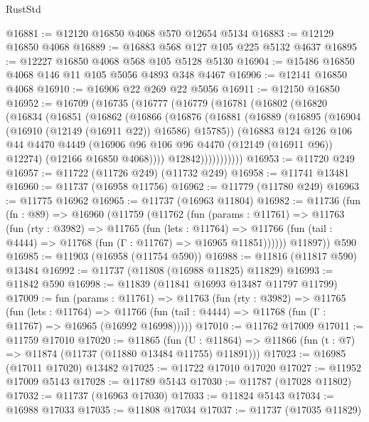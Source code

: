 \begin{lexlean}{RustStd}
\begin{coremodule}
@16881 := @12120 @16850 @4068 @570 @12654 @5134
@16883 := @12129 @16850 @4068
@16889 := @16883 @568 @127 @105 @225 @5132 @4637
@16895 := @12227 @16850 @4068 @568 @105 @5128 @5130
@16904 := @15486 @16850 @4068 @146 @11 @105 @5056 @4893 @348 @4467
@16906 := @12141 @16850 @4068
@16910 := @16906 @22 @269 @22 @5056
@16911 := @12150 @16850
@16952 := @16709
    (@16735
      (@16777
        (@16779
          (@16781
            (@16802
              (@16820
                (@16834
                  (@16851
                    (@16862
                      (@16866
                        (@16876
                          (@16881
                            (@16889
                              (@16895 (@16904 (@16910 (@12149 (@16911 @22)) @16586) @15785))
                              (@16883
                                @124
                                @126
                                @106
                                @44
                                @4470
                                @4449
                                (@16906 @96 @106 @96 @4470 (@12149 (@16911 @96)) @12274)
                                (@12166 @16850 @4068))))
                          @12842)))))))))))
@16953 := @11720 @249
@16957 := @11722 (@11726 @249) (@11732 @249)
@16958 := @11741 @13481
@16960 := @11737 (@16958 @11756)
@16962 := @11779 (@11780 @249)
@16963 := @11775 @16962
@16965 := @11737 (@16963 @11804)
@16982 := @11736
    (fun (fn : @89) =>
    @16960
      (@11759
        (@11762
          (fun (params : @11761) =>
          @11763
            (fun (rty : @3982) =>
            @11765
              (fun (lets : @11764) =>
              @11766 (fun (tail : @4444) => @11768 (fun (Γ : @11767) => @16965 @11851))))))
        @11897))
    @590
@16985 := @11903 (@16958 (@11754 @590))
@16988 := @11816 (@11817 @590) @13484
@16992 := @11737 (@11808 (@16988 @11825) @11829)
@16993 := @11842 @590
@16998 := @11839 (@11841 @16993 @13487 @11797 @11799)
@17009 := fun (params : @11761) =>
  @11763
    (fun (rty : @3982) =>
    @11765
      (fun (lets : @11764) =>
      @11766 (fun (tail : @4444) => @11768 (fun (Γ : @11767) => @16965 (@16992 @16998)))))
@17010 := @11762 @17009
@17011 := @11759 @17010
@17020 := @11865
    (fun (U : @11864) => @11866 (fun (t : @7) => @11874 (@11737 (@11880 @13484 @11755) @11891)))
@17023 := @16985 (@17011 @17020) @13482
@17025 := @11722 @17010 @17020
@17027 := @11952 @17009 @5143
@17028 := @11789 @5143
@17030 := @11787 (@17028 @11802)
@17032 := @11737 (@16963 @17030)
@17033 := @11824 @5143
@17034 := @16988 @17033
@17035 := @11808 @17034
@17037 := @11737 (@17035 @11829)

\end{coremodule}
\end{lexlean}
